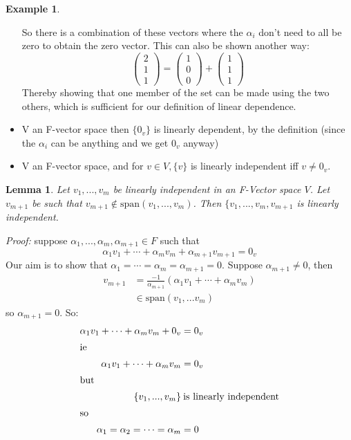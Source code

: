 \documentclass{report}
\newtheorem{lemma}[theorem]{Lemma}
\theoremstyle{remark}
\theoremstyle{definition}
\theoremstyle{definition}
\newtheorem{example}[theorem]{Example}
\theoremstyle{theorem}
\begin{document}
\begin{example}
\begin{itemize}
So there is a combination of these vectors where the $\alpha_i$ don't need to all be zero to obtain the zero vector. This can also be shown another way:
\[\begin{pmatrix}2\\1\\1\end{pmatrix} = \begin{pmatrix}1\\0\\0\end{pmatrix} + \begin{pmatrix}1\\1\\1\end{pmatrix} \]
Thereby showing that one member of the set can be made using the two others, which is sufficient for our definition of linear dependence.
\item V an F-vector space then $\{0_v\}$ is linearly dependent, by the definition (since the $\alpha_i$ can be anything and we get $0_v$ anyway)
\item V an F-vector space, and for $v \in V, \{v\}$ is linearly independent iff $v \neq 0_v$.
\end{itemize}
\end{example}
\begin{lemma}
Let $v_1,..., v_m$ be linearly independent in an F-Vector space $V$. Let $v_{m+1}$ be such that $v_{m+1} \notin \text{span}(v_1, ..., v_m)$. Then $ \{v_1, ... ,v_m, v_{m+1}$ is linearly independent.
\end{lemma}
\emph{Proof:} suppose $\alpha_1,..., \alpha_m, \alpha_{m+1} \in F$ such that
\[ \alpha_1v_1 + \cdots + \alpha_mv_m + \alpha_{m+1}v_{m+1} = 0_v\]
Our aim is to show that $\alpha_1 = \cdots = \alpha_m = \alpha_{m+1} = 0$. Suppose $\alpha_{m+1} \neq 0$, then 
\begin{align*}
    v_{m+1} &= \frac{-1}{\alpha_{m+1}}(\alpha_1v_1+ \cdots + \alpha_mv_m)\\
    &\in \text{span}(v_1, ... v_m) 
\end{align*}
so $\alpha_{m+1} = 0$. So:
\begin{align*}
    \alpha_1v_1 + \cdots + \alpha_mv_m + 0_v &= 0_v\\
    \intertext{ie}
    \alpha_1v_1 + \cdots + \alpha_mv_m &= 0_v\\
    \intertext{but}
    \{v_1, ..., v_m \} &\> \text{is linearly independent}\\
    \intertext{so}
    \alpha_1 = \alpha_2 = \cdots = \alpha_m &= 0
\end{align*}
\end{document}
